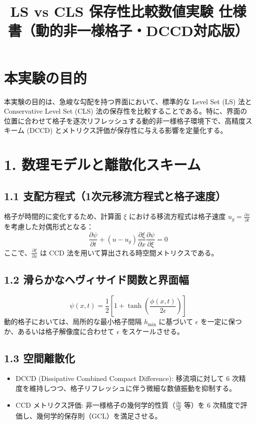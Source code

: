 \documentclass[12pt, a4paper, titlepage]{article}
\title{LS vs CLS 保存性比較数値実験 仕様書（動的非一様格子・DCCD対応版）}
\author{}
\date{}
\begin{document}
\maketitle

\section*{本実験の目的}
本実験の目的は、急峻な勾配を持つ界面において、標準的な Level Set (LS) 法と Conservative Level Set (CLS) 法の保存性を比較することである。特に、界面の位置に合わせて格子を逐次リフレッシュする動的非一様格子環境下で、高精度スキーム (DCCD) とメトリクス評価が保存性に与える影響を定量化する。

\section*{1. 数理モデルと離散化スキーム}

\subsection*{1.1 支配方程式（1次元移流方程式と格子速度）}
格子が時間的に変化するため、計算面 $\xi$ における移流方程式は格子速度 $u_g = \frac{\partial x}{\partial t}$ を考慮した対偶形式となる：
$$\frac{\partial \psi}{\partial t} + (u - u_g) \frac{\partial \xi}{\partial x} \frac{\partial \psi}{\partial \xi} = 0$$ここで、$\frac{\partial \xi}{\partial x}$ は CCD 法を用いて算出される時空間メトリクスである。

\subsection*{1.2 滑らかなヘヴィサイド関数と界面幅}$$\psi(x, t) = \frac{1}{2} \left[ 1 + \tanh\left( \frac{\phi(x, t)}{2\epsilon} \right) \right]$$動的格子においては、局所的な最小格子間隔 $h_{\min}$ に基づいて $\epsilon$ を一定に保つか、あるいは格子解像度に合わせて $\epsilon$ をスケールさせる。

\subsection*{1.3 空間離散化}
\begin{itemize}
    \item DCCD (Dissipative Combined Compact Difference): 移流項に対して 6 次精度を維持しつつ、格子リフレッシュに伴う微細な数値振動を抑制する。
    \item CCD メトリクス評価: 非一様格子の幾何学的性質（$\frac{\partial x}{\partial \xi}$ 等）を 6 次精度で評価し、幾何学的保存則（GCL）を満足させる。
\end{itemize}
\end{document}
